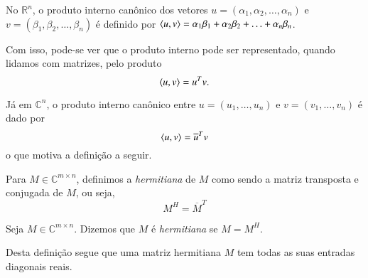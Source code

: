 \begin{exemplo}
  No ${\mathbb{R}}^n$, o produto interno canônico dos vetores $u=(\alpha_1,\alpha_2,\ldots,\alpha_n)$ e $v=(\beta_1,\beta_2,\ldots,\beta_n)$ é definido por $\langle u, v \rangle = \alpha_1\beta_1+\alpha_2\beta_2+\ldots+\alpha_n\beta_n$. 

  Com isso, pode-se ver que o produto interno pode ser representado, quando lidamos com matrizes, pelo produto
  \begin{equation*}
    \langle u, v \rangle = u^Tv.
  \end{equation*}
  
  Já em ${\mathbb{C}}^n$, o produto interno canônico entre $u = (u_1,\ldots,u_n)$ e $v=(v_1,\ldots,v_n)$ é dado por
  \begin{equation*}
  	\langle u, v \rangle = \overline{u}^Tv
  \end{equation*}  
  o que motiva a definição a seguir.
\end{exemplo}

\begin{defi}
	Para $M \in {\mathbb{C}}^{m\times n}$, definimos a \emph{hermitiana} de $M$ como sendo a matriz transposta e conjugada de $M$, ou seja,
    \begin{equation*}
    	M^H = \overline{M}^T
    \end{equation*}
\end{defi}

\begin{defi}
	Seja $M\in {\mathbb{C}}^{m\times n}$. Dizemos que $M$ é \emph{hermitiana} se $M=M^H$.
\end{defi}

Desta definição segue que uma matriz hermitiana $M$ tem todas as suas entradas diagonais reais.

